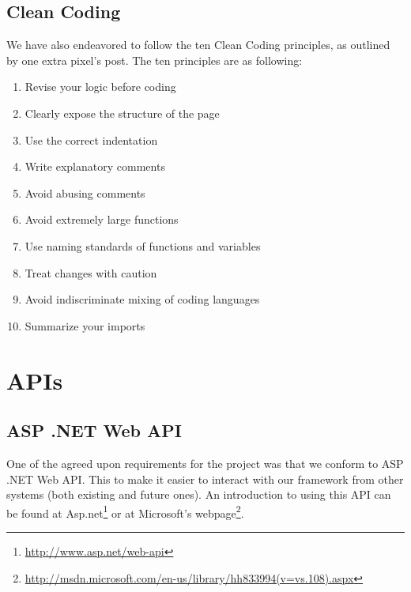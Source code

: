 \subsection{Clean Coding}\label{cleanCoding}
We have also endeavored to follow the ten Clean Coding principles, as outlined by one extra pixel's post. \cite{cleanCoding}
The ten principles are as following:
\begin{enumerate}

\item Revise your logic before coding
\item Clearly expose the structure of the page
\item Use the correct indentation
\item Write explanatory comments
\item Avoid abusing comments
\item Avoid extremely large functions
\item Use naming standards of functions and variables
\item Treat changes with caution
\item Avoid indiscriminate mixing of coding languages
\item Summarize your imports

\end{enumerate}

\section{APIs}
\subsection{ASP .NET Web API}
One of the agreed upon requirements for the project was that we conform to ASP .NET Web API. This to make it easier to interact with our framework from other systems (both existing and future ones). An introduction to using this API can be found at Asp.net\footnote{\href{http://www.asp.net/web-api}{http://www.asp.net/web-api}} or at Microsoft's webpage\footnote{\href{http://msdn.microsoft.com/en-us/library/hh833994(v=vs.108).aspx}{http://msdn.microsoft.com/en-us/library/hh833994(v=vs.108).aspx}}.
